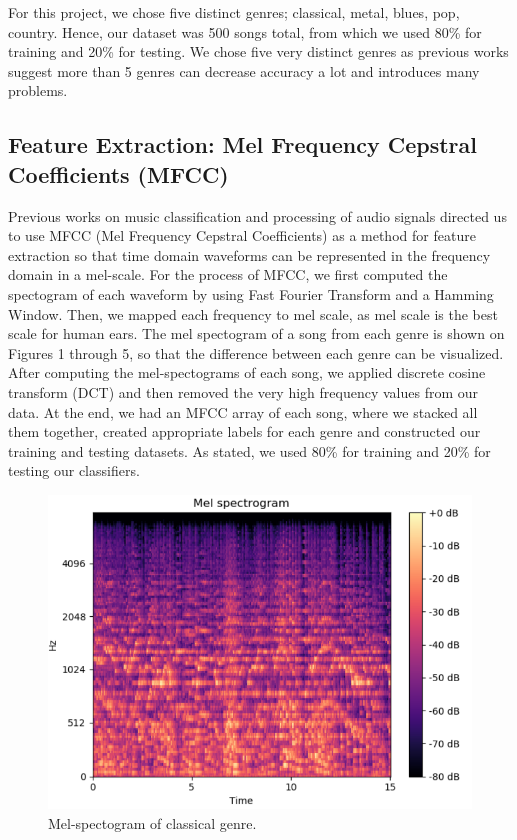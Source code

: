 For this project, we chose five distinct genres; classical, metal, blues, pop, country. Hence, our dataset was 500 songs total, from which we used 80\% for training and 20\% for testing. We chose five very distinct genres as previous works \cite{Chun:2010} suggest more than 5 genres can decrease accuracy a lot and introduces many problems. 

\subsection{Feature Extraction: Mel Frequency Cepstral Coefficients (MFCC)}
Previous works \cite{MFCC:2011} on music classification and processing of audio signals directed us to use MFCC (Mel Frequency Cepstral Coefficients) as a method for feature extraction so that time domain waveforms can be represented in the frequency domain in a mel-scale. For the process of MFCC, we first computed the spectogram of each waveform by using Fast Fourier Transform and a Hamming Window. Then, we mapped each frequency to mel scale, as mel scale is the best scale for human ears. The mel spectogram of a song from each genre is shown on Figures 1 through 5, so that the difference between each genre can be visualized. After computing the mel-spectograms of each song, we applied discrete cosine transform (DCT) and then removed the very high frequency values from our data. At the end, we had an MFCC array of each song, where we stacked all them together, created appropriate labels for each genre and constructed our training and testing datasets. As stated, we used 80\% for training and 20\% for testing our classifiers. 


\begin{figure}
\begin{center}
\includegraphics[scale=0.2]{./figures/classical.png}
\end{center}
\caption
{
Mel-spectogram of classical genre.
}
\label{fig:big_picture1}
\end{figure}

